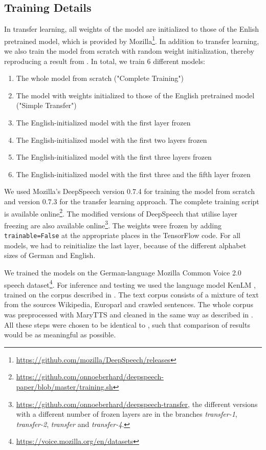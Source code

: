 \documentclass[12pt]{article}    %
\begin{document}
\subsection{Training Details} \label{sec:training}
In transfer learning, all weights of the model are initialized to those of the Enlish pretrained model, which is provided by Mozilla\footnote{\url{https://github.com/mozilla/DeepSpeech/releases}}. In addition to transfer learning, we also train the model from scratch with random weight initialization, thereby reproducing a result from \textcite{agarwal-zesch-2019-german}. In total, we train 6 different models:
\begin{enumerate}
    \item The whole model from scratch ("Complete Training")
    \item The model with weights initialized to those of the English pretrained model ("Simple Transfer")
    \item The English-initialized model with the first layer frozen
    \item The English-initialized model with the first two layers frozen
    \item The English-initialized model with the first three layers frozen
    \item The English-initialized model with the first three and the fifth layer frozen
\end{enumerate}
We used Mozilla's DeepSpeech version 0.7.4 for training the model from scratch and version 0.7.3 for the transfer learning approach. The complete training script is available online\footnote{\url{https://github.com/onnoeberhard/deepspeech-paper/blob/master/training.sh}}. The modified versions of DeepSpeech that utilise layer freezing are also available online\footnote{\url{https://github.com/onnoeberhard/deepspeech-transfer}, the different versions with a different number of frozen layers are in the branches \emph{transfer-1}, \emph{\mbox{transfer-2}}, \emph{transfer} and \emph{\mbox{transfer-4}}.}. The weights were frozen by adding \texttt{trainable=False} at the appropriate places in the TensorFlow code. For all models, we had to reinitialize the last layer, because of the different alphabet sizes of German and English.

We trained the models on the German-language Mozilla Common Voice 2.0 speech dataset\footnote{\url{https://voice.mozilla.org/en/datasets}}. For inference and testing we used the language model KenLM \parencite{heafield-2011-kenlm}, trained on the corpus described in \parencite[Section 3.2]{Radeck-Arneth2015}. The text corpus consists of a mixture of text from the sources Wikipedia, Europarl and crawled sentences. The whole corpus was preprocessed with MaryTTS \parencite{schroder2003german} and cleaned in the same way as described in \parencite{agarwal-zesch-2019-german}. All these steps were chosen to be identical to \parencite{agarwal-zesch-2019-german}, such that comparison of results would be as meaningful as possible.
\end{document}
